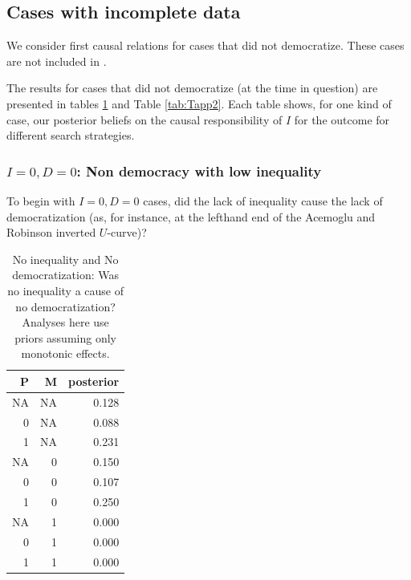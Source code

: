 \documentclass[12pt,]{book}
\begin{document}
\hypertarget{cases-with-incomplete-data}{%
\subsection{Cases with incomplete data}\label{cases-with-incomplete-data}}

We consider first causal relations for cases that did not democratize. These cases are not included in \citet{haggard2012inequality}.

The results for cases that did not democratize (at the time in question) are presented in tables \ref{tab:Tapp1} and Table \ref{tab:Tapp2}. Each table shows, for one kind of case, our posterior beliefs on the causal responsibility of \(I\) for the outcome for different search strategies.

\hypertarget{i0-d0-non-democracy-with-low-inequality}{%
\subsubsection{\texorpdfstring{\(I=0, D=0\): Non democracy with low inequality}{I=0, D=0: Non democracy with low inequality}}\label{i0-d0-non-democracy-with-low-inequality}}

To begin with \(I=0, D=0\) cases, did the lack of inequality cause the lack of democratization (as, for instance, at the lefthand end of the Acemoglu and Robinson inverted \(U\)-curve)?

\begin{table}[t]

\caption{\label{tab:Tapp1}No inequality and No democratization: Was no inequality a cause of no democratization? Analyses here use priors assuming only monotonic effects.}
\centering
\begin{tabular}{r|r|r}
\hline
P & M & posterior\\
\hline
NA & NA & 0.128\\
\hline
0 & NA & 0.088\\
\hline
1 & NA & 0.231\\
\hline
NA & 0 & 0.150\\
\hline
0 & 0 & 0.107\\
\hline
1 & 0 & 0.250\\
\hline
NA & 1 & 0.000\\
\hline
0 & 1 & 0.000\\
\hline
1 & 1 & 0.000\\
\hline
\end{tabular}
\end{table}
\end{document}
